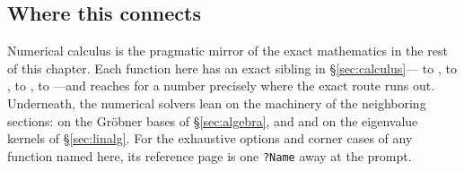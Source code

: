 
\subsection*{Where this connects}

Numerical calculus is the pragmatic mirror of the exact mathematics in the rest of this chapter. Each
function here has an exact sibling in \S\ref{sec:calculus}--- to ,  to
,  to ,  to ---and reaches for a number precisely
where the exact route runs out. Underneath, the numerical solvers lean on the machinery of the neighboring
sections:  on the Gröbner bases of \S\ref{sec:algebra}, and  and  on the
eigenvalue kernels of \S\ref{sec:linalg}. For the exhaustive options and corner cases of any function named
here, its reference page is one \texttt{?Name} away at the prompt.
